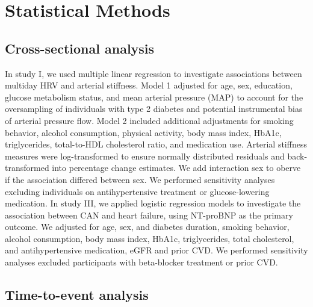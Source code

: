 \documentclass[
  a4paper,
  headsepline=true,
  open=any]{scrbook}
\begin{document}
\hypertarget{statistical-methods}{%
\section{Statistical Methods}\label{statistical-methods}}

\hypertarget{cross-sectional-analysis}{%
\subsection{Cross-sectional analysis}\label{cross-sectional-analysis}}

In study I, we used multiple linear regression to investigate
associations between multiday HRV and arterial stiffness. Model 1
adjusted for age, sex, education, glucose metabolism status, and mean
arterial pressure (MAP) to account for the oversampling of individuals
with type 2 diabetes and potential instrumental bias of arterial
pressure flow. Model 2 included additional adjustments for smoking
behavior, alcohol consumption, physical activity, body mass index,
HbA1c, triglycerides, total-to-HDL cholesterol ratio, and medication
use. Arterial stiffness measures were log-transformed to ensure normally
distributed residuals and back-transformed into percentage change
estimates. We add interaction sex to oberve if the association differed
between sex. We performed sensitivity analyses excluding individuals on
antihypertensive treatment or glucose-lowering medication. In study III,
we applied logistic regression models to investigate the association
between CAN and heart failure, using NT-proBNP as the primary outcome.
We adjusted for age, sex, and diabetes duration, smoking behavior,
alcohol consumption, body mass index, HbA1c, triglycerides, total
cholesterol, and antihypertensive medication, eGFR and prior CVD. We
performed sensitivity analyses excluded participants with beta-blocker
treatment or prior CVD.

\hypertarget{time-to-event-analysis}{%
\subsection{Time-to-event analysis}\label{time-to-event-analysis}}
\end{document}
